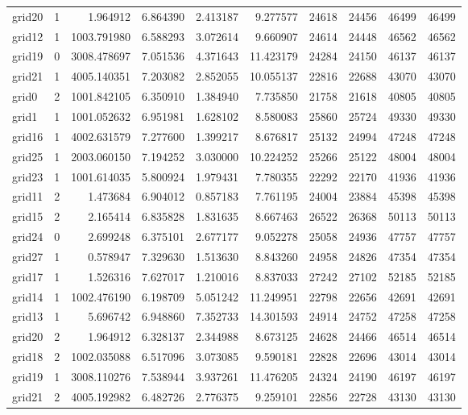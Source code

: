 \begin{longtable}{|l|r|r|r|r|r|r|r|r|r|}
grid20 & 1 & 1.964912 & 6.864390 & 2.413187 & 9.277577 & 24618 & 24456 & 46499 & 46499 \\
grid12 & 1 & 1003.791980 & 6.588293 & 3.072614 & 9.660907 & 24614 & 24448 & 46562 & 46562 \\
grid19 & 0 & 3008.478697 & 7.051536 & 4.371643 & 11.423179 & 24284 & 24150 & 46137 & 46137 \\
grid21 & 1 & 4005.140351 & 7.203082 & 2.852055 & 10.055137 & 22816 & 22688 & 43070 & 43070 \\
grid0 & 2 & 1001.842105 & 6.350910 & 1.384940 & 7.735850 & 21758 & 21618 & 40805 & 40805 \\
grid1 & 1 & 1001.052632 & 6.951981 & 1.628102 & 8.580083 & 25860 & 25724 & 49330 & 49330 \\
grid16 & 1 & 4002.631579 & 7.277600 & 1.399217 & 8.676817 & 25132 & 24994 & 47248 & 47248 \\
grid25 & 1 & 2003.060150 & 7.194252 & 3.030000 & 10.224252 & 25266 & 25122 & 48004 & 48004 \\
grid23 & 1 & 1001.614035 & 5.800924 & 1.979431 & 7.780355 & 22292 & 22170 & 41936 & 41936 \\
grid11 & 2 & 1.473684 & 6.904012 & 0.857183 & 7.761195 & 24004 & 23884 & 45398 & 45398 \\
grid15 & 2 & 2.165414 & 6.835828 & 1.831635 & 8.667463 & 26522 & 26368 & 50113 & 50113 \\
grid24 & 0 & 2.699248 & 6.375101 & 2.677177 & 9.052278 & 25058 & 24936 & 47757 & 47757 \\
grid27 & 1 & 0.578947 & 7.329630 & 1.513630 & 8.843260 & 24958 & 24826 & 47354 & 47354 \\
grid17 & 1 & 1.526316 & 7.627017 & 1.210016 & 8.837033 & 27242 & 27102 & 52185 & 52185 \\
grid14 & 1 & 1002.476190 & 6.198709 & 5.051242 & 11.249951 & 22798 & 22656 & 42691 & 42691 \\
grid13 & 1 & 5.696742 & 6.948860 & 7.352733 & 14.301593 & 24914 & 24752 & 47258 & 47258 \\
grid20 & 2 & 1.964912 & 6.328137 & 2.344988 & 8.673125 & 24628 & 24466 & 46514 & 46514 \\
grid18 & 2 & 1002.035088 & 6.517096 & 3.073085 & 9.590181 & 22828 & 22696 & 43014 & 43014 \\
grid19 & 1 & 3008.110276 & 7.538944 & 3.937261 & 11.476205 & 24324 & 24190 & 46197 & 46197 \\
grid21 & 2 & 4005.192982 & 6.482726 & 2.776375 & 9.259101 & 22856 & 22728 & 43130 & 43130 \\

\end{longtable}
